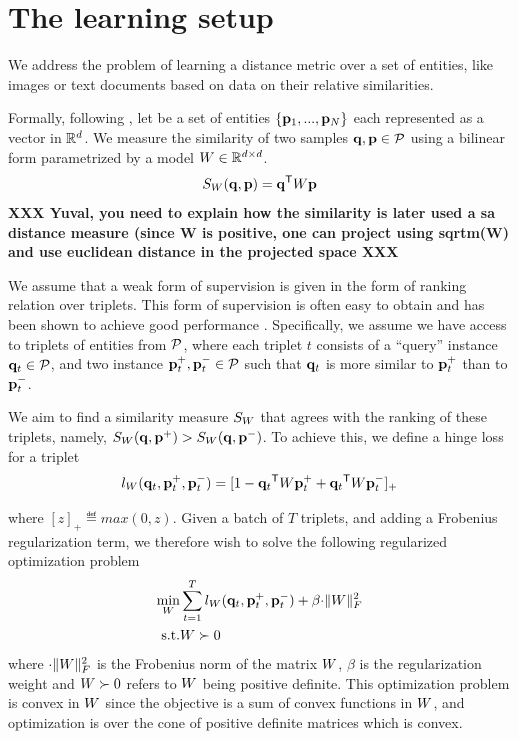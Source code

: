 \documentclass{article}
\begin{document}
\section{The learning setup}
We address the problem of learning a distance metric over a set of
entities, like images or text documents based on data on their
relative similarities. 

Formally, following \cite{OASIS}, let  be a set of entities
$\{{\mathbf{p}}_1,...,{\mathbf{p}}_N\}$ each represented as a vector in $\mathbb{R}^d$.  We measure
the similarity of two samples ${\mathbf{q}}, {\mathbf{p}} \in \cal{P}$ using a bilinear
form parametrized by a model ${W} \in \mathbb{R}^{d \times d}$.
\begin{equation}
  S_{{W}}({\mathbf{q}}, {\mathbf{p}}) = {\mathbf{q}}{}^\mathsf{T} {W} {\mathbf{p}}
\end{equation}
\newline
{\bf{XXX Yuval, you need to explain how the similarity is later used a sa
distance measure (since W is positive, one can project using sqrtm(W)
and use euclidean distance in the projected space  XXX }}
\newline

We assume that a weak form of supervision is given in the form of
ranking relation over triplets. This form of supervision is often easy
to obtain and has been shown to achieve good performance
\cite{lmnn,oasis,qian}. Specifically, we assume we have access to
triplets of entities from $\cal{P}$, where each triplet $t$ consists of
a ``query'' instance ${\mathbf{q}}_{t} \in \cal{P}$, and two instance ${\mathbf{p}}_{t}^{+},
{\mathbf{p}}_{t}^{-} \in \cal{P}$ such that ${\mathbf{q}}_t$ is more similar to ${\mathbf{p}}_t^+$
than to ${\mathbf{p}}_t^-$.

We aim to find a similarity measure $S_{{W}}$ that agrees with the
ranking of these triplets, namely, $S_{{W}}({\mathbf{q}}, {\mathbf{p}}^+) > S_{{W}}({\mathbf{q}},
{\mathbf{p}}^-)$. To achieve this, we define a hinge loss for a triplet
\begin{equation}
  l_{{W}}({\mathbf{q}}_t, {\mathbf{p}}_t^{+}, {\mathbf{p}}_t^{-})=[1-{\mathbf{q}}_t{}^\mathsf{T} {W} {\mathbf{p}}_t^{+}+{\mathbf{q}}_t{}^\mathsf{T}{W}{\mathbf{p}}_t^{-}]_{+}
  \label{hingelt}
\end{equation}

where $[z]_{+} \eqdef max(0,z)$.  Given a batch of $T$ triplets, and
adding a Frobenius regularization term, we therefore wish to solve the
following regularized optimization problem
\begin{eqnarray}
  \min_{{W}}& \sum_{t=1}^T  l_{{W}}({\mathbf{q}}_t, {\mathbf{p}}_t^{+}, {\mathbf{p}}_t^{-}) + \beta {\cdot \|{W}\|_F^2}
 \\  \nonumber
   \rm{s.t.}& {W} \succ 0
  \label{hingelt}
\end{eqnarray}
where ${\cdot \|{W}\|_F^2}$ is the Frobenius norm of the matrix ${W}$, $\beta$ is
the regularization weight and ${W} \succ 0$ refers to ${W}$ being
positive definite. This optimization problem is convex in ${W}$ since
the objective is a sum of convex functions in ${W}$, and optimization
is over the cone of positive definite matrices which is convex.
\end{document}
